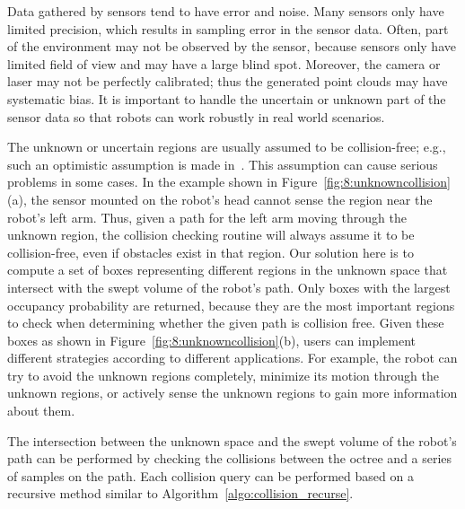 Data gathered by sensors tend to have error and noise.
Many sensors only have limited precision, which results in sampling
error in the sensor data. Often, part of the environment may not be
observed by the sensor, because sensors only have limited field of
view and may have a large blind spot. Moreover, the camera or laser
may not be perfectly calibrated; thus the generated point clouds
may have systematic bias. It is important to handle the uncertain or
unknown part of the sensor data so that robots can work robustly in
real world scenarios.

The unknown or uncertain regions are usually assumed to be
collision-free; e.g., such an optimistic assumption is made
in~\cite{Rusu:RPG:2009}. This assumption can cause serious problems in some
cases. In the example shown in Figure~\ref{fig:8:unknowncollision}(a), the sensor
mounted on the robot's head cannot sense the region near the robot's
left arm. Thus, given a path for the left arm moving
through the unknown region, the collision checking routine will always
assume it to be collision-free, even if obstacles exist in that
region. Our solution here is to compute a set of
boxes representing different regions in the unknown space that
intersect with the swept volume of the robot's path. Only boxes
with the largest occupancy probability are returned, because they are
the most important regions to check when determining whether the given path is
collision free. Given these boxes as shown in Figure~\ref{fig:8:unknowncollision}(b), users can implement different
strategies according to different applications. For example, the robot
can try to avoid the unknown regions completely, minimize its motion
through the unknown regions, or actively sense the unknown regions to
gain more information about them.

The intersection between the unknown space and the swept volume of the
robot's path can be performed by checking the collisions between
the octree and a series of samples on the path. Each collision
query can be performed based on a recursive method similar to Algorithm~\ref{algo:collision_recurse}. 

